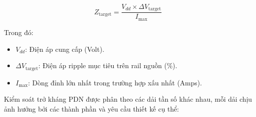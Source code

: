                 \begin{equation}
                    Z_{\text{target}} = \frac{V_{dd} \times \Delta V_{\text{target}}}{I_{\max}}
                \end{equation}
                
                Trong đó:
                \begin{itemize}
                    \item $V_{dd}$: Điện áp cung cấp (Volt).
                    \item $\Delta V_{\text{target}}$: Điện áp ripple mục tiêu trên rail nguồn (\%).
                    \item $I_{\max}$: Dòng đỉnh lớn nhất trong trường hợp xấu nhất (Amps).
                \end{itemize}
                
                Kiểm soát trở kháng PDN được phân theo các dải tần số khác nhau, mỗi dải chịu ảnh hưởng bởi các thành phần và yêu cầu thiết kế cụ thể:
                
